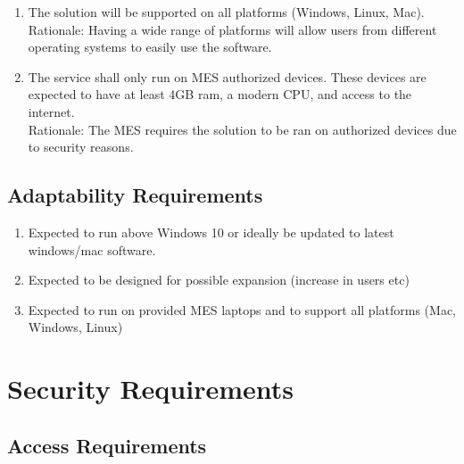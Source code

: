 \documentclass[12pt]{article}
\begin{document}
\begin{enumerate}
  
  \item The solution will be supported on all platforms (Windows, Linux, Mac). \\
  Rationale: Having a wide range of platforms will allow users from different operating systems to easily use the software.
  \item The service shall only run on MES authorized devices. These devices are expected to have at least 4GB ram, a modern CPU, and access to the internet. \\
  Rationale: The MES requires the solution to be ran on authorized devices due to security reasons.
\end{enumerate}
\subsection{Adaptability Requirements}
\begin{enumerate}
  
  \item Expected to run above Windows 10 or ideally be updated to latest windows/mac software. \\
  \item Expected to be designed for possible expansion (increase in users etc) \\
  \item Expected to run on provided MES laptops and to support all platforms (Mac, Windows, Linux)
\end{enumerate}





\section{Security Requirements}
\subsection{Access Requirements}
\end{document}
